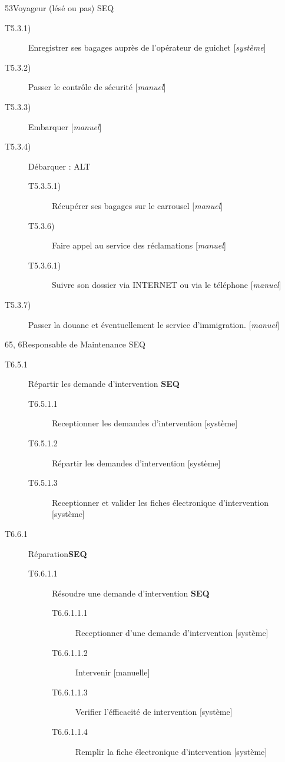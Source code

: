 \dta
{5}{3}{Voyageur (lésé ou pas)}
{SEQ}
{
\begin{description}
	\item [T5.3.1)] Enregistrer ses bagages auprès de l'opérateur de guichet [\textsl{système}]
	\item [T5.3.2)] Passer le contrôle de sécurité [\textsl{manuel}]
	\item [T5.3.3)] Embarquer [\textsl{manuel}]
	\item [T5.3.4)] Débarquer : ALT
	\begin{description}
		\item [T5.3.5.1)] Récupérer ses bagages sur le carrousel [\textsl{manuel}]
		\item [T5.3.6)] Faire appel au service des réclamations [\textsl{manuel}]
		\item [T5.3.6.1)] Suivre son dossier via INTERNET ou via le téléphone [\textsl{manuel}]
	\end{description}
	\item [T5.3.7)] Passer la douane et éventuellement le service d'immigration. [\textsl{manuel}]
\end{description}
}

\hspace{1cm}

\dta
{6}{5, 6}{Responsable de Maintenance}
{SEQ}
{
\begin{description}
	\item[T6.5.1] Répartir les demande d'intervention \textbf{SEQ}
	\begin{description}
		\item[T6.5.1.1] Receptionner les demandes d'intervention [système]
		\item[T6.5.1.2] Répartir les demandes d'intervention [système]
		\item[T6.5.1.3] Receptionner et valider les fiches électronique d'intervention [système]
	\end{description}
	\item[T6.6.1] Réparation\textbf{SEQ}
	\begin{description}
		\item[T6.6.1.1] Résoudre une demande d'intervention \textbf{SEQ}
		\begin{description}
			\item[T6.6.1.1.1] Receptionner d'une demande d'intervention [système]
			\item[T6.6.1.1.2] Intervenir [manuelle]
			\item[T6.6.1.1.3] Verifier l'éfficacité de intervention [système]
			\item[T6.6.1.1.4] Remplir la fiche électronique d'intervention [système]
		\end{description}
	\end{description}
\end{description}
}

